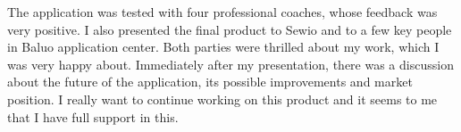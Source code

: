 The application was tested with four professional coaches, whose feedback was very positive. I also presented the final product to Sewio and to a few key people in Baluo application center. Both parties were thrilled about my work, which I was very happy about. Immediately after my presentation, there was a discussion about the future of the application, its possible improvements and market position. I really want to continue working on this product and it seems to me that I have full support in this.
